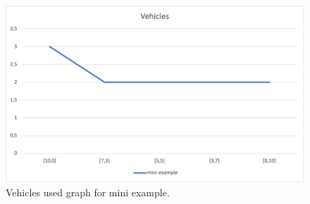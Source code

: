 \begin{figure}[H]
    \centering
    \includegraphics[width=1.0\columnwidth]{../graphs/mini-example-vehicles.png}
    \caption{Vehicles used graph for mini example.}
\end{figure}
